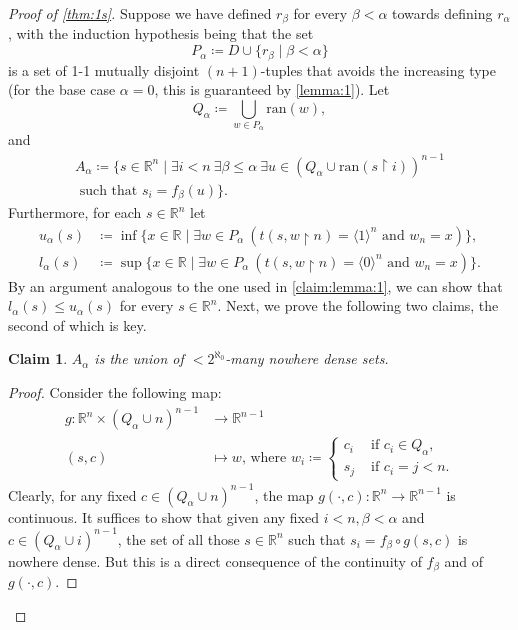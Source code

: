 \documentclass[12pt]{amsart}
\newtheorem{claim}{Claim}[theorem]
\theoremstyle{definition}
\theoremstyle{remark}
\begin{document}
\begin{proof}[Proof of \cref{thm:1s}]
Suppose we have defined $r_\beta$ for every $\beta < \alpha$ towards defining $r_\alpha$, with the induction hypothesis being that the set
\[
P_\alpha \coloneqq D \cup \{r_\beta \mid \beta < \alpha\}
\]
is a set of 1-1 mutually disjoint $(n+1)$-tuples that avoids the increasing type (for the base case $\alpha = 0$, this is guaranteed by \cref{lemma:1}). Let
\[
Q_\alpha \coloneqq \bigcup_{w \in P_{\alpha}} \mathrm{ran}(w),
\]
and
\begin{multline*}
A_\alpha \coloneqq \big\{s \in \mathbb{R}^n \mid \exists i < n \ \exists \beta \le \alpha \ \exists u \in (Q_\alpha \cup \mathrm{ran}(s \upharpoonright i))^{n-1} \\ \text{ such that }s_i = f_\beta(u)\big\}.
\end{multline*}
Furthermore, for each $s \in \mathbb{R}^n$ let 
\begin{align*}
u_\alpha(s) &\coloneqq \inf \{x \in \mathbb{R} \mid \exists w \in P_\alpha \ (t(s, w \upharpoonright n) = \langle 1 \rangle^n \text{ and } w_n = x)\},\\[0.4em]
l_\alpha(s) &\coloneqq \sup \{x \in \mathbb{R} \mid \exists w \in P_\alpha \ (t(s, w \upharpoonright n) = \langle 0 \rangle^n \text{ and } w_n = x)\}.
\end{align*}
By an argument analogous to the one used in \cref{claim:lemma:1}, we can show that $l_\alpha(s) \le u_\alpha(s)$ for every $s \in \mathbb{R}^n$.  Next, we prove the following two claims, the second of which is key.
\begin{claim}\label{claim:thm:1-1}
$A_\alpha$ is the union of ${<}2^{\aleph_0}$-many nowhere dense sets.
\end{claim}
\begin{proof}
Consider the following map:
\begin{align*}
g:\mathbb{R}^{n} \times (Q_\alpha \cup n)^{n-1} &\longrightarrow \mathbb{R}^{n-1}\\
(s, c) &\longmapsto w\text{, where } w_i \coloneqq \begin{cases}
c_i &\text{ if } c_i \in Q_\alpha,\\
s_j &\text{ if } c_i=j < n.
\end{cases}
\end{align*}
Clearly, for any fixed $c \in (Q_\alpha \cup n)^{n-1}$, the map $g({\cdot}, c) : \mathbb{R}^n \rightarrow \mathbb{R}^{n-1}$ is continuous. It suffices to show that given any fixed $i <n, \beta < \alpha$ and $c \in (Q_\alpha \cup i)^{n-1}$, the set of all those $s \in \mathbb{R}^n$ such that $s_i = f_\beta \circ g(s, c)$ is nowhere dense. But this is a direct consequence of the continuity of $f_\beta$ and of $g({\cdot}, c)$. 
\end{proof}


\end{proof}
\end{document}
